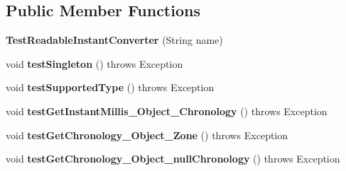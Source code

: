 \subsection*{Public Member Functions}
\begin{DoxyCompactItemize}
\item 
\hypertarget{classorg_1_1joda_1_1time_1_1convert_1_1_test_readable_instant_converter_a817aef6804e30fc9c179fccfac58ce8f}{{\bfseries Test\-Readable\-Instant\-Converter} (String name)}\label{classorg_1_1joda_1_1time_1_1convert_1_1_test_readable_instant_converter_a817aef6804e30fc9c179fccfac58ce8f}

\item 
\hypertarget{classorg_1_1joda_1_1time_1_1convert_1_1_test_readable_instant_converter_a4afb4d7396d15d8aeb92dece93b14cd3}{void {\bfseries test\-Singleton} ()  throws Exception }\label{classorg_1_1joda_1_1time_1_1convert_1_1_test_readable_instant_converter_a4afb4d7396d15d8aeb92dece93b14cd3}

\item 
\hypertarget{classorg_1_1joda_1_1time_1_1convert_1_1_test_readable_instant_converter_aae92bb8f0b70b1bc80d2ddfe720ce149}{void {\bfseries test\-Supported\-Type} ()  throws Exception }\label{classorg_1_1joda_1_1time_1_1convert_1_1_test_readable_instant_converter_aae92bb8f0b70b1bc80d2ddfe720ce149}

\item 
\hypertarget{classorg_1_1joda_1_1time_1_1convert_1_1_test_readable_instant_converter_af4e7bc4dabe24d28262bfad36321366e}{void {\bfseries test\-Get\-Instant\-Millis\-\_\-\-Object\-\_\-\-Chronology} ()  throws Exception }\label{classorg_1_1joda_1_1time_1_1convert_1_1_test_readable_instant_converter_af4e7bc4dabe24d28262bfad36321366e}

\item 
\hypertarget{classorg_1_1joda_1_1time_1_1convert_1_1_test_readable_instant_converter_a85999cc8f8700de72d134e4397fc503c}{void {\bfseries test\-Get\-Chronology\-\_\-\-Object\-\_\-\-Zone} ()  throws Exception }\label{classorg_1_1joda_1_1time_1_1convert_1_1_test_readable_instant_converter_a85999cc8f8700de72d134e4397fc503c}

\item 
\hypertarget{classorg_1_1joda_1_1time_1_1convert_1_1_test_readable_instant_converter_a06ca68f51fcabbeb62fa556d1ad615e8}{void {\bfseries test\-Get\-Chronology\-\_\-\-Object\-\_\-null\-Chronology} ()  throws Exception }\label{classorg_1_1joda_1_1time_1_1convert_1_1_test_readable_instant_converter_a06ca68f51fcabbeb62fa556d1ad615e8}


\end{DoxyCompactItemize}
